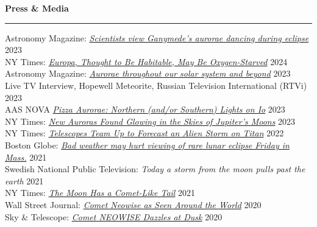 \documentclass[12pt]{report}
\begin{document}
\noindent\bf{Press \& Media}\rm \hspace*{\fill} \\
\rule{\textwidth}{1pt}
\noindent Astronomy Magazine: \href{https://www.astronomy.com/science/scientists-view-ganymedes-aurorae-dancing-during-eclipse/}{{\it Scientists view Ganymede’s aurorae dancing during eclipse}} \hfill 2023\\
\noindent NY Times: \href{https://www.nytimes.com/2024/03/04/science/europa-moon-oxygen.html}{{\it Europa, Thought to Be Habitable, May Be Oxygen-Starved}} \hfill 2024\\
\noindent Astronomy Magazine: \href{https://www.astronomy.com/science/aurorae-throughout-our-solar-system-and-beyond}{{\it Aurorae throughout our solar system and beyond}} \hfill 2023\\
\noindent Live TV Interview, Hopewell Meteorite, Russian Television International (RTVi) \hfill 2023\\
\noindent AAS NOVA \href{https://aasnova.org/2023/07/25/pizza-aurorae-northern-and-or-southern-lights-on-io/}{{\it Pizza Aurorae: Northern (and/or Southern) Lights on Io}} \hfill 2023\\
\noindent NY Times: \href{https://www.nytimes.com/2023/02/16/science/auroras-jupiter-moons.html}{{\it New Auroras Found Glowing in the Skies of Jupiter’s Moons}} \hfill 2023\\
\noindent NY Times: \href{https://www.nytimes.com/2022/12/05/science/titan-webb-telescope-pictures.html}{{\it Telescopes Team Up to Forecast an Alien Storm on Titan}} \hfill 2022\\
\noindent Boston Globe: \href{https://www.bostonglobe.com/2021/11/18/metro/bad-weather-may-hurt-viewing-rare-lunar-eclipse-early-friday-mass/}{{\it Bad weather may hurt viewing of rare lunar eclipse Friday in Mass.}} \hfill 2021\\
\noindent Swedish National Public Television: {\it Today a storm from the moon pulls past the earth} \hfill 2021\\
\noindent NY Times: \href{https://www.nytimes.com/2021/03/04/science/moon-tail-beam.html}{{\it The Moon Has a Comet-Like Tail}} \hfill 2021\\
\noindent Wall Street Journal: \href{https://www.wsj.com/articles/comet-neowise-as-seen-around-the-world-11595368898}{{\it Comet Neowise as Seen Around the World}} \hfill 2020\\
\noindent Sky \& Telescope: \href{https://skyandtelescope.org/astronomy-news/comet-neowise-dazzles-at-dusk/}{{\it Comet NEOWISE Dazzles at Dusk}} \hfill 2020\\
\end{document}
